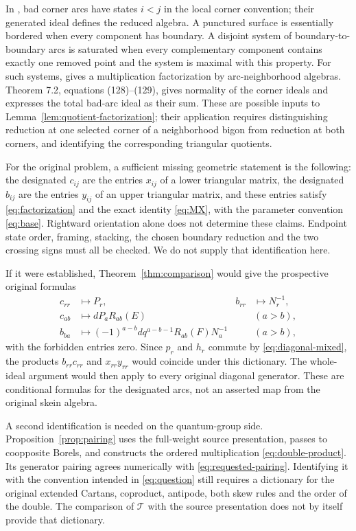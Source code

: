 \documentclass[11pt]{article}
\theoremstyle{definition}
\theoremstyle{remark}
\newcommand{\cT}{\mathcal{T}}
\begin{document}
In \cite{LY}, bad corner arcs have states $i<j$ in the local corner convention; their generated ideal defines the reduced algebra. A punctured surface is essentially bordered when every component has boundary. A disjoint system of boundary-to-boundary arcs is saturated when every complementary component contains exactly one removed point and the system is maximal with this property. For such systems, \cite[Theorem 6.2]{LY} gives a multiplication factorization by arc-neighborhood algebras. Theorem 7.2, equations (128)--(129), gives normality of the corner ideals and expresses the total bad-arc ideal as their sum. These are possible inputs to Lemma~\ref{lem:quotient-factorization}; their application requires distinguishing reduction at one selected corner of a neighborhood bigon from reduction at both corners, and identifying the corresponding triangular quotients.

For the original problem, a sufficient missing geometric statement is the following: the designated $c_{ij}$ are the entries $x_{ij}$ of a lower triangular matrix, the designated $b_{ij}$ are the entries $y_{ij}$ of an upper triangular matrix, and these entries satisfy \eqref{eq:factorization} and the exact identity \eqref{eq:MX}, with the parameter convention \eqref{eq:base}. Rightward orientation alone does not determine these claims. Endpoint state order, framing, stacking, the chosen boundary reduction and the two crossing signs must all be checked. We do not supply that identification here.

If it were established, Theorem~\ref{thm:comparison} would give the prospective original formulas
\[
 \begin{aligned}
 c_{rr}&\mapsto P_r,& b_{rr}&\mapsto N_r^{-1},\\
 c_{ab}&\mapsto dP_aR_{ab}(E)&& (a>b),\\
 b_{ba}&\mapsto(-1)^{a-b}dq^{a-b-1}R_{ab}(F)N_a^{-1}&& (a>b),
 \end{aligned}
\]
with the forbidden entries zero. Since $p_r$ and $h_r$ commute by \eqref{eq:diagonal-mixed}, the products $b_{rr}c_{rr}$ and $x_{rr}y_{rr}$ would coincide under this dictionary. The whole-ideal argument would then apply to every original diagonal generator. These are conditional formulas for the designated arcs, not an asserted map from the original skein algebra.

A second identification is needed on the quantum-group side. Proposition~\ref{prop:pairing} uses the full-weight source presentation, passes to coopposite Borels, and constructs the ordered multiplication \eqref{eq:double-product}. Its generator pairing agrees numerically with \eqref{eq:requested-pairing}. Identifying it with the convention intended in \eqref{eq:question} still requires a dictionary for the original extended Cartans, coproduct, antipode, both skew rules and the order of the double. The comparison of $\cT$ with the source presentation does not by itself provide that dictionary.
\end{document}
